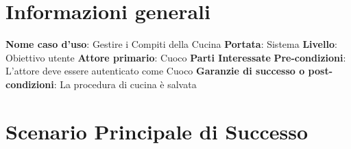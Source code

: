 
\section*{Informazioni generali}
\textbf{Nome caso d'uso}{: Gestire i Compiti della Cucina}\newline
\textbf{Portata}{: Sistema}\newline
\textbf{Livello}{: Obiettivo utente}\newline
\textbf{Attore primario}{: Cuoco}\newline
\textbf{Parti Interessate}\newline
\textbf{Pre-condizioni}{: L'attore deve essere autenticato come Cuoco}\newline
\textbf{Garanzie di successo o post-condizioni}{: La procedura di cucina è salvata}

\section*{Scenario Principale di Successo}
\def\arraystretch{1.55}
